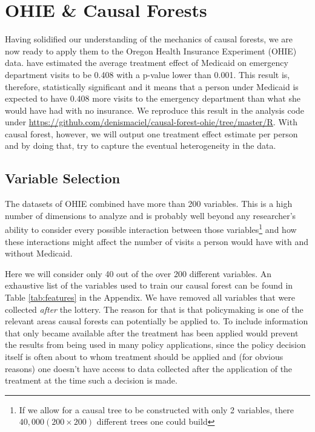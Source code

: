 \section{OHIE \& Causal Forests}

Having solidified our understanding of the mechanics of causal forests, we are now ready to apply them to the Oregon Health Insurance Experiment (OHIE) data. \cite{taubmanMedicaidIncreasesEmergencyDepartment2014} have estimated the average treatment effect of Medicaid on emergency department visits to be 0.408 with a p-value lower than 0.001. This result is, therefore, statistically significant and it means that a person under Medicaid is expected to have 0.408 more visits to the emergency department  than what she would have had with no insurance. We reproduce this result in the analysis code under \url{https://github.com/denismaciel/causal-forest-ohie/tree/master/R}. With causal forest, however, we will output one treatment effect estimate per person and by doing that, try to capture the eventual heterogeneity in the data.

\subsection{Variable Selection}

The datasets of OHIE combined have more than 200 variables. This is a high number of dimensions to analyze and is probably well beyond any researcher's ability to consider every possible interaction between those variables\footnote{If we allow for a causal tree to be constructed with only 2 variables, there $40,000 (200 \times 200)$ different trees one could build} and how these interactions might affect the number of visits a person would have with and without Medicaid. 

Here we will consider only 40 out of the over 200 different variables. An exhaustive list of the variables used to train our causal forest can be found in Table \ref{tab:features} in the Appendix. We have removed all variables that were collected \textit{after} the lottery. The reason for that is that policymaking is one of the relevant areas causal forests can potentially be applied to. To include information that only became available after the treatment has been applied would prevent the results from being used in many policy applications, since the policy decision itself is often about to whom treatment should be applied and (for obvious reasons) one doesn't have access to data collected after the application of the treatment at the time such a decision is made.

